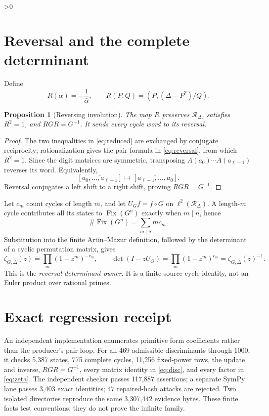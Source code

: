 \documentclass[10pt]{article}
\newtheorem{proposition}{Proposition}
\providecommand{\CRevisionRound}{2}
\begin{document}
\ifnum\CRevisionRound>0
\section{Reversal and the complete determinant}
Define
\begin{equation}\label{eq:reversal}
 R(\alpha)=-\frac1{\bar\alpha},\qquad
 R(P,Q)=(P,(\Delta-P^2)/Q).
\end{equation}

\begin{proposition}[Reversing involution]\label{prop:reverse}
The map \(R\) preserves \(\mathcal R_\Delta\), satisfies \(R^2=1\), and
\(RGR=G^{-1}\).  It sends every cycle word to its reversal.
\end{proposition}

\begin{proof}
The two inequalities in \eqref{eq:reduced} are exchanged by conjugate
reciprocity; rationalization gives the pair formula in \eqref{eq:reversal},
from which \(R^2=1\).  Since the digit matrices are symmetric, transposing
\(A(a_0)\cdots A(a_{\ell-1})\) reverses its word.  Equivalently,
\[
 [\overline{a_0,\ldots,a_{\ell-1}}]
 \longmapsto
 [\overline{a_{\ell-1},\ldots,a_0}].
\]
Reversal conjugates a left shift to a right shift, proving \(RGR=G^{-1}\).
\end{proof}

Let \(c_m\) count cycles of length \(m\), and let \(U_Gf=f\circ G\) on
\(\ell^2(\mathcal R_\Delta)\).  A length-\(m\) cycle contributes all its
states to \(\operatorname{Fix}(G^n)\) exactly when \(m\mid n\), hence
\begin{equation}\label{eq:fixed}
 \#\operatorname{Fix}(G^n)=\sum_{m\mid n}m c_m.
\end{equation}
Substitution into the finite Artin--Mazur definition, followed by the
determinant of a cyclic permutation matrix, gives
\begin{equation}\label{eq:zeta}
 \zeta_{G,\Delta}(z)=\prod_m(1-z^m)^{-c_m},
 \qquad
 \det(I-zU_G)=\prod_m(1-z^m)^{c_m}=\zeta_{G,\Delta}(z)^{-1}.
\end{equation}
This is the \emph{reversal-determinant owner}.  It is a finite source cycle
identity, not an Euler product over rational primes.

\section{Exact regression receipt}
An independent implementation enumerates primitive form coefficients rather
than the producer's pair loop.  For all 469 admissible discriminants through
1000, it checks 5,387 states, 775 complete cycles, 11,256 fixed-power rows,
the update and inverse, \(RGR=G^{-1}\), every matrix identity in
\eqref{eq:disc}, and every factor in \eqref{eq:zeta}.  The independent checker
passes 117,887 assertions; a separate SymPy lane passes 3,403 exact
identities; 47 repaired-hash attacks are rejected.  Two isolated directories
reproduce the same 3,307,442 evidence bytes.  These finite facts test
conventions; they do not prove the infinite family.
\fi
\end{document}
